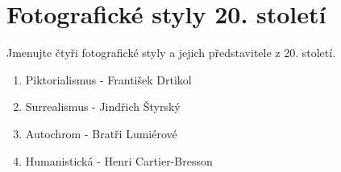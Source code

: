 \section{Fotografické styly 20. století}
Jmenujte čtyři fotografické styly a jejich představitele z 20. století.
\begin{enumerate}
    \item Piktorialismus - František Drtikol
    \item Surrealismus - Jindřich Štyrský
    \item Autochrom - Bratři Lumiérové
    \item Humanistická - Henri Cartier-Bresson
\end{enumerate}